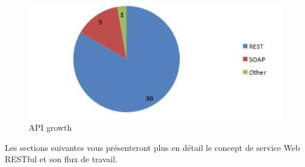 \begin{figure}[! ht ]
			\centering
			\includegraphics[scale=.4]{./images/api_protocol.png}
			\caption {API growth}
		\end{figure}
		
Les sections suivantes vous présenteront plus en détail le concept de service Web RESTful et son flux de travail.
